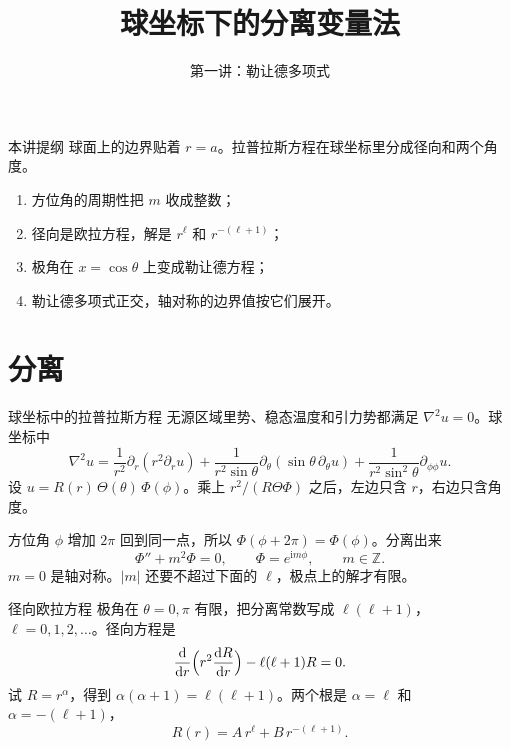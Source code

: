 \documentclass[fontset=windows, chinese, 10pt, xcolor=dvipsnames]{beamer}
\title{球坐标下的分离变量法}
\subtitle{第一讲：勒让德多项式}
\begin{document}
\begin{frame}
  \titlepage
\end{frame}

\begin{frame}{本讲提纲}
  球面上的边界贴着 $r=a$。拉普拉斯方程在球坐标里分成径向和两个角度。
  \begin{enumerate}
    \item 方位角的周期性把 $m$ 收成整数；
    \item 径向是欧拉方程，解是 $r^{\ell}$ 和 $r^{-(\ell+1)}$；
    \item 极角在 $x=\cos\theta$ 上变成勒让德方程；
    \item 勒让德多项式正交，轴对称的边界值按它们展开。
  \end{enumerate}
\end{frame}

\section{分离}

\begin{frame}{球坐标中的拉普拉斯方程}
  无源区域里势、稳态温度和引力势都满足 $\nabla^2 u=0$。球坐标中
  \[
    \nabla^2 u
    =\frac{1}{r^2}\partial_r(r^2\partial_r u)
     +\frac{1}{r^2\sin\theta}\partial_{\theta}(\sin\theta\,\partial_{\theta}u)
     +\frac{1}{r^2\sin^2\theta}\partial_{\phi\phi}u.
  \]
  设 $u=R(r)\,\Theta(\theta)\,\Phi(\phi)$。乘上 $r^2/(R\Theta\Phi)$ 之后，左边只含 $r$，右边只含角度。
\end{frame}

\begin{frame}{方位角}
  $\phi$ 增加 $2\pi$ 回到同一点，所以 $\Phi(\phi+2\pi)=\Phi(\phi)$。分离出来
  \begin{equation*}
    \Phi''+m^2\Phi=0,
    \qquad
    \Phi=e^{\mathrm{i}m\phi},
    \qquad m\in\mathbb{Z}.
  \end{equation*}
  $m=0$ 是轴对称。$|m|$ 还要不超过下面的 $\ell$，极点上的解才有限。
\end{frame}

\begin{frame}{径向欧拉方程}
  极角在 $\theta=0,\pi$ 有限，把分离常数写成 $\ell(\ell+1)$，$\ell=0,1,2,\ldots$。径向方程是
  \[
    \frac{\mathrm{d}}{\mathrm{d}r}\Bigl(r^2\frac{\mathrm{d}R}{\mathrm{d}r}\Bigr)
    -\ell(\ell+1)R=0.
  \]
  试 $R=r^{\alpha}$，得到 $\alpha(\alpha+1)=\ell(\ell+1)$。两个根是 $\alpha=\ell$ 和 $\alpha=-(\ell+1)$，
  \begin{equation*}
    \boxed{\displaystyle
      R(r)=A\,r^{\ell}+B\,r^{-(\ell+1)}.}
  \end{equation*}
\end{frame}
\end{document}
